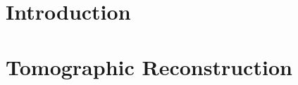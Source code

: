 
\section{Introduction} %
	\label{sec:introduction}


\section{Tomographic Reconstruction} %
	\label{sec:tomographic_reconstruction}
	

